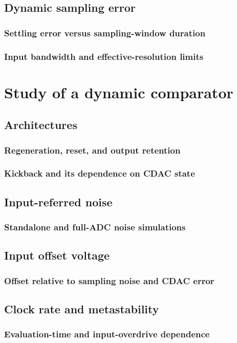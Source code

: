 \documentclass[PhD, UKenglish]{scrbook}
\begin{document}
\subsection{Dynamic sampling error}

\fig
\subsubsection{Settling error versus sampling-window duration}
\subsubsection{Input bandwidth and effective-resolution limits}

\section{Study of a dynamic comparator}
\subsection{Architectures}
\subsubsection{Regeneration, reset, and output retention}
\subsubsection{Kickback and its dependence on CDAC state}
\subsection{Input-referred noise}
\subsubsection{Standalone and full-ADC noise simulations}
\subsection{Input offset voltage}
\subsubsection{Offset relative to sampling noise and CDAC error}
\subsection{Clock rate and metastability}
\subsubsection{Evaluation-time and input-overdrive dependence}
\end{document}
